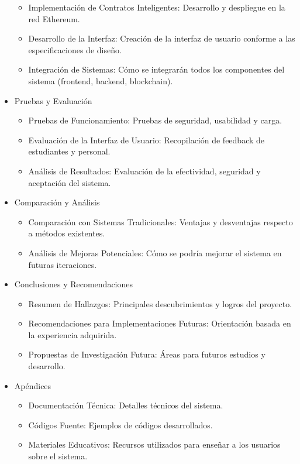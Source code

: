 \documentclass{report}
\begin{document}
\begin{itemize}
\begin{itemize}
			\item Implementación de Contratos Inteligentes: Desarrollo y despliegue en la red Ethereum.
			\item Desarrollo de la Interfaz: Creación de la interfaz de usuario conforme a las especificaciones de diseño.
			\item Integración de Sistemas: Cómo se integrarán todos los componentes del sistema (frontend, backend, blockchain).
		\end{itemize}
		\item Pruebas y Evaluación
		\begin{itemize}
			\item Pruebas de Funcionamiento: Pruebas de seguridad, usabilidad y carga.
			\item Evaluación de la Interfaz de Usuario: Recopilación de feedback de estudiantes y personal.
			\item Análisis de Resultados: Evaluación de la efectividad, seguridad y aceptación del sistema.
		\end{itemize}
		\item Comparación y Análisis
		\begin{itemize}
			\item Comparación con Sistemas Tradicionales: Ventajas y desventajas respecto a métodos existentes.
			\item Análisis de Mejoras Potenciales: Cómo se podría mejorar el sistema en futuras iteraciones.
		\end{itemize}
		\item Conclusiones y Recomendaciones
		\begin{itemize}
			\item Resumen de Hallazgos: Principales descubrimientos y logros del proyecto.
			\item Recomendaciones para Implementaciones Futuras: Orientación basada en la experiencia adquirida.
			\item Propuestas de Investigación Futura: Áreas para futuros estudios y desarrollo.
		\end{itemize}
		\item Apéndices
		\begin{itemize}
			\item Documentación Técnica: Detalles técnicos del sistema.
			\item Códigos Fuente: Ejemplos de códigos desarrollados.
			\item Materiales Educativos: Recursos utilizados para enseñar a los usuarios sobre el sistema.
		\end{itemize}
	\end{itemize}
	
\end{document}
